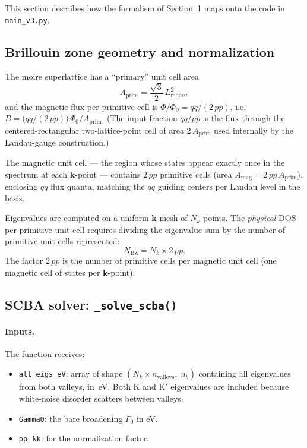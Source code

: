 \documentclass[11pt]{article}
\newcommand{\Gam}{\Gamma}
\newcommand{\BZ}{\mathrm{BZ}}
\newcommand{\Nk}{N_k}
\begin{document}
This section describes how the formalism of Section~1 maps onto the
code in \texttt{main\_v3.py}.

\subsection{Brillouin zone geometry and normalization}

The moire superlattice has a ``primary'' unit cell area
\begin{equation}
  A_{\mathrm{prim}} = \frac{\sqrt{3}}{2}\, L_{\mathrm{moire}}^2,
\end{equation}
and the magnetic flux per primitive cell is
$\Phi/\Phi_0 = qq/(2\,pp)$, i.e.
$B = \bigl(qq/(2\,pp)\bigr)\,\Phi_0 / A_{\mathrm{prim}}$.
(The input fraction $qq/pp$ is the flux through the
centered-rectangular two-lattice-point cell of area
$2\,A_{\mathrm{prim}}$ used internally by the Landau-gauge
construction.)

The magnetic unit cell --- the region whose states appear exactly once
in the spectrum at each $\mathbf{k}$-point --- contains $2\,pp$
primitive cells (area $A_{\mathrm{mag}} = 2\,pp\,A_{\mathrm{prim}}$),
enclosing $qq$ flux quanta, matching the $qq$ guiding centers per
Landau level in the basis.

Eigenvalues are computed on a uniform $\mathbf{k}$-mesh of $\Nk$
points.  The \emph{physical} DOS per primitive unit cell requires
dividing the eigenvalue sum by the number of primitive unit cells
represented:
\begin{equation}\label{eq:Nbz}
  N_\BZ = \Nk \times 2\,pp.
\end{equation}
The factor $2\,pp$ is the number of primitive cells per magnetic unit
cell (one magnetic cell of states per $\mathbf{k}$-point).

\subsection{SCBA solver: \texttt{\_solve\_scba()}}

\paragraph{Inputs.}  The function receives:
\begin{itemize}
  \item \texttt{all\_eigs\_eV}: array of shape
    $(\Nk \times n_{\mathrm{valleys}},\; n_b)$ containing all
    eigenvalues from both valleys, in~eV.  Both K and K$'$ eigenvalues
    are included because white-noise disorder scatters between valleys.
  \item \texttt{Gamma0}: the bare broadening $\Gam_0$ in eV.
  \item \texttt{pp}, \texttt{Nk}: for the normalization factor.
\end{itemize}
\end{document}

